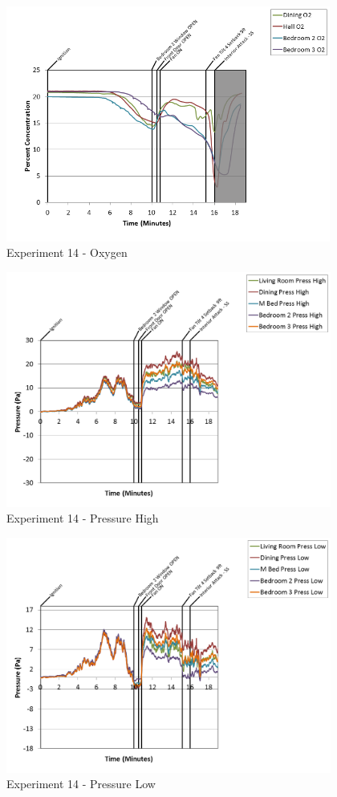 \documentclass{article}
\begin{document}
\begin{appendices}
\clearpage

\begin{figure}[h!]
	\centering
	\includegraphics[height=3.05in]{0_Images/Results_Charts/Exp_14_Charts/Oxygen.png}
	\caption{Experiment 14 - Oxygen}
\end{figure}


\begin{figure}[h!]
	\centering
	\includegraphics[height=3.05in]{0_Images/Results_Charts/Exp_14_Charts/PressureHigh.png}
	\caption{Experiment 14 - Pressure High}
\end{figure}

\clearpage

\begin{figure}[h!]
	\centering
	\includegraphics[height=3.05in]{0_Images/Results_Charts/Exp_14_Charts/PressureLow.png}
	\caption{Experiment 14 - Pressure Low}
\end{figure}



\end{appendices}
\end{document}
